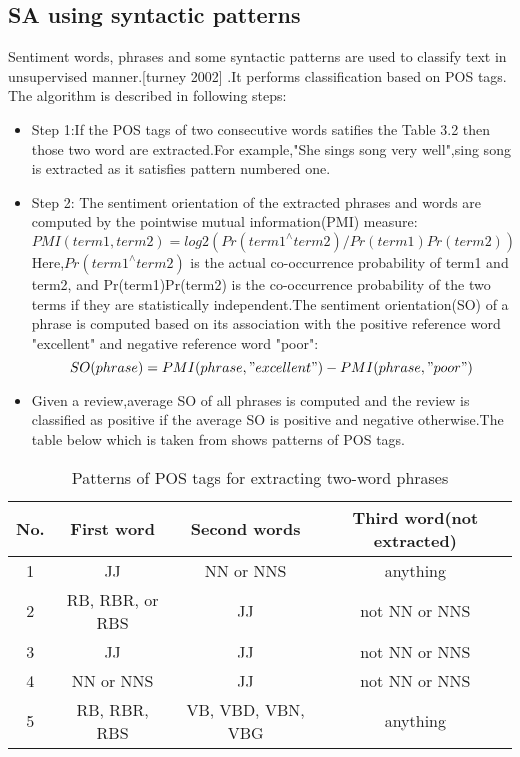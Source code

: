 \documentclass[a4paper,12pt]{report}
\begin{document}
\subsection{SA using syntactic patterns}
Sentiment words, phrases and some syntactic patterns  are used to classify text in unsupervised manner.[turney 2002] .It performs classification based on POS tags.
The algorithm is described in following steps:
\begin{itemize}
    \item Step 1:If the POS tags of two consecutive words satifies the Table 3.2 then those two word are extracted.For example,"She sings song very well",sing song is extracted as it satisfies pattern numbered one.
    \item Step 2: The sentiment orientation of the extracted phrases and words are computed by the pointwise mutual information(PMI) measure:
    \begin{equation}
        PMI(term1,term2) = log2(Pr(term1 ^\wedge term2)/Pr(term1)Pr(term2))
    \end{equation}
    Here,$Pr(term1 ^\wedge  term2)$ is the actual co-occurrence probability of term1 and term2, and Pr(term1)Pr(term2) is the co-occurrence probability of the two terms if they are statistically independent.The sentiment orientation(SO) of a phrase is computed based on its association with the positive reference word "excellent" and negative reference word "poor":
    \begin{equation}
        SO(phrase) = PMI(phrase,"excellent") - PMI(phrase,"poor")
    \end{equation}
    \item Given a review,average SO of all phrases is computed and the review is classified as positive if the average SO is positive and negative otherwise.The table below which is taken from \citep{turney2002thumbs} shows patterns of POS tags.
\end{itemize}
\begin{table}[h]
\centering
     \begin{tabular}{||c |c|| c|| c||} 
  
     \hline
     No. & First word & Second words & Third word(not extracted) \\ [0.5ex] 
     \hline\hline
     1 & JJ & NN or NNS & anything \\ 
     \hline
     2 & RB, RBR, or RBS & JJ & not NN or NNS \\
     \hline
     3 & JJ & JJ & not NN or NNS  \\
     \hline
     4 & NN or NNS & JJ & not NN or NNS \\
     \hline
     5 & RB, RBR, RBS & VB, VBD, VBN, VBG & anything \\ [1ex] 
     \hline
    \end{tabular}

\caption{Patterns of POS tags for extracting two-word phrases}
\label{tab:table1}
\end{table}
\end{document}
